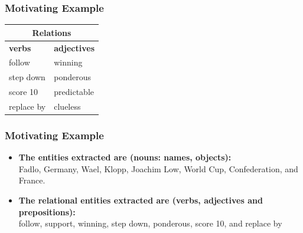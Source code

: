 \documentclass[xcolor=table]{beamer}
\begin{document}
\begin{frame}
\frametitle{Motivating Example}
\begin{table}[]
\begin{tabular}{|l|l|}
\hline
\multicolumn{2}{|c|}{\cellcolor[HTML]{C0C0C0}\textbf{Relations}} \\ \hline
\textbf{verbs}               & \textbf{adjectives}               \\ \hline
follow                       & winning                           \\ \hline
step down                    & ponderous                         \\ \hline
score 10                     & predictable                       \\ \hline
replace by                   & clueless                          \\ \hline
\end{tabular}
\end{table}
\end{frame}
\begin{frame}
\frametitle{Motivating Example}
\begin{itemize}
\item \textbf{The entities extracted are (nouns: names, objects):} 
\\ Fadlo, Germany, Wael, Klopp, Joachim Low, World Cup, Confederation, and France.

\item \textbf{The relational entities extracted are (verbs, adjectives and prepositions):}
\\ follow, support, winning, step down, ponderous, score 10, and replace by
\end{itemize}

\end{frame}
\end{document}
